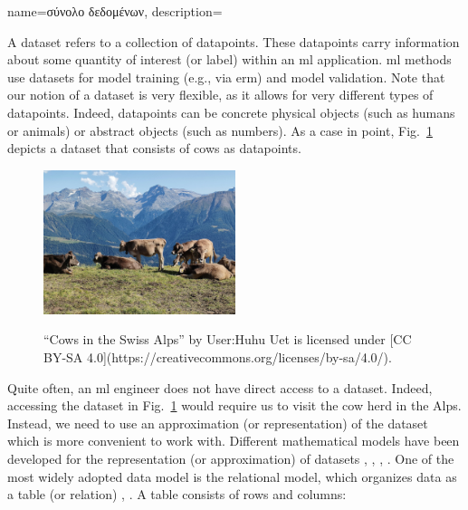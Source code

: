 {name={\foreignlanguage{greek}{σύνολο δεδομένων}},
	description={A dataset refers to a collection of \gls{datapoint}s. These 
		\gls{datapoint}s carry information about some quantity of interest (or \gls{label}) within 
		an \gls{ml} application. \gls{ml} methods use datasets for \gls{model} training (e.g., via \gls{erm})
		and \gls{model} \gls{validation}. Note that our notion of a dataset is very flexible, as 
		it allows for very different types of \gls{datapoint}s. Indeed, \gls{datapoint}s can be concrete 
		physical objects (such as humans or animals) or abstract objects (such as numbers). 
		As a case in point, Fig.\ \ref{fig_cows_dataset} depicts a dataset that consists of cows as 
		\gls{datapoint}s. 
		\begin{figure}[H]
				\begin{center}
		\label{fig:cowsintheswissalps}
		\includegraphics[width=0.5\textwidth]{assets/Cows_in_the_Swiss_Alps}
		  \end{center}
		\caption{\label{fig_cows_dataset}“Cows in the Swiss Alps” by User:Huhu Uet is licensed under [CC BY-SA 4.0](https://creativecommons.org/licenses/by-sa/4.0/).}
	  \end{figure}
       Quite often, an \gls{ml} engineer does not have direct access to a dataset. Indeed, accessing the 
       dataset in Fig.\ \ref{fig_cows_dataset} would require us to visit the cow herd in the Alps. Instead, 
       we need to use an approximation (or representation) of the dataset which is more convenient 
       to work with. Different mathematical \gls{model}s have been developed for the representation (or approximation) 
       of datasets \cite{silberschatz2019database}, \cite{abiteboul1995foundations}, \cite{hoberman2009data}, \cite{ramakrishnan2002database}. 
       One of the most widely adopted data \gls{model} is the relational \gls{model}, which organizes \gls{data} 
       as a table (or relation) \cite{codd1970relational}, \cite{silberschatz2019database}.
		A table consists of rows and columns:
}}
